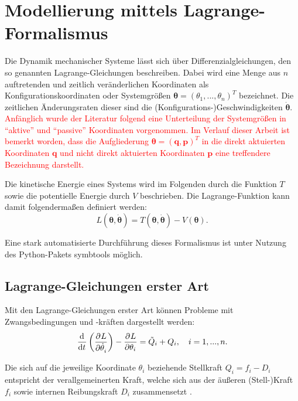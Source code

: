 \section{Modellierung mittels Lagrange-Formalismus}
Die Dynamik mechanischer Systeme lässt sich über Differenzialgleichungen, den so genannten Lagrange-Gleichungen beschreiben. Dabei wird eine Menge aus $n$ auftretenden und zeitlich veränderlichen Koordinaten als Konfigurationskoordinaten oder Systemgrößen $\boldsymbol{\theta} = (\theta_1, ..., \theta_n)^T$ bezeichnet. Die zeitlichen Änderungsraten dieser sind die (Konfigurations-)Geschwindigkeiten $\dot{\boldsymbol{\theta}}$. \textcolor{red}{Anfänglich wurde der Literatur \cite[S.10]{DissKnoll} folgend eine Unterteilung der Systemgrößen in ``aktive'' und ``passive'' Koordinaten vorgenommen. Im Verlauf dieser Arbeit ist bemerkt worden, dass die 
Aufgliederung $\boldsymbol{\theta} = (\mathbf{q}, \mathbf{p})^T$ in die direkt aktuierten Koordinaten $\mathbf{q}$ und nicht direkt aktuierten Koordinaten $\mathbf{p}$ eine treffendere Bezeichnung darstellt.}
\cite[S.7]{DissKnoll} 

Die kinetische Energie eines Systems wird im Folgenden durch die Funktion $T$ sowie die potentielle Energie durch $V$ beschrieben. Die Lagrange-Funktion kann damit folgendermaßen definiert werden:
\begin{equation}
L(\boldsymbol{\theta}, \dot{\boldsymbol{\theta}}) = T(\boldsymbol{\theta}, \dot{\boldsymbol{\theta}}) - V(\boldsymbol{\theta}).
\end{equation}

Eine stark automatisierte Durchführung dieses Formalismus ist unter Nutzung des Python-Pakets symbtools \cite{symbtools} möglich.

\subsection{Lagrange-Gleichungen erster Art}
\label{sec:Lagrange1_theory}

Mit den Lagrange-Gleichungen erster Art können Probleme mit Zwangsbedingungen und -kräften dargestellt werden:
\begin{equation}
	\frac{\mathrm{d}^{}}{\mathrm{d}{t}^{}}\left(\frac{\partial^{}L}{\partial{\dot{\theta}_i}^{}} \right) - \frac{\partial^{}L}{\partial{\theta_i}^{}} = \tilde{Q}_i + Q_i, \quad i = 1, ..., n.
\end{equation}

Die sich auf die jeweilige Koordinate $\theta_i$ beziehende Stellkraft $Q_i = f_i - D_i$ entspricht der verallgemeinerten Kraft, welche sich aus der äußeren (Stell-)Kraft $f_i$ sowie internen Reibungskraft $D_i$ zusammensetzt \cite[S. 49]{Lagrange}.

